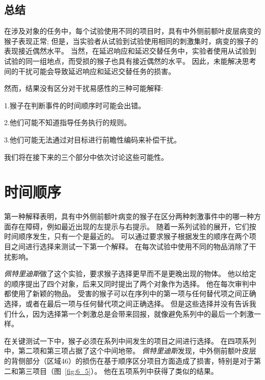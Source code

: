 \subsection{总结}

在涉及对象的任务中，每个试验使用不同的项目时，具有中外侧前额叶皮层病变的猴子表现正常; 
但是，当实验者从试验到试验使用相同的刺激集时，病变的猴子的表现接近偶然水平。
当然，在延迟响应和延迟交替任务中，实验者使用从试验到试验的同一组地点，而受损的猴子也具有接近偶然的水平。
因此，未能解决思考间的干扰可能会导致延迟响应和延迟交替任务的损害。


然而，结果没有区分对干扰易感性的三种可能解释:
\par


1.猴子在判断事件的时间顺序时可能会出错。
\par

2.他们可能不知道指导任务执行的规则。
\par

3.他们可能无法通过对目标进行前瞻性编码来补偿干扰。

我们将在接下来的三个部分中依次讨论这些可能性。



\section{时间顺序}

第一种解释表明，具有中外侧前额叶病变的猴子在区分两种刺激事件中的哪一种方面存在障碍，例如最近出现的左提示与右提示。
随着一系列试验的展开，它们按时间顺序发生，只有一个是最近的。
可以通过要求猴子根据发生的顺序在两个项目之间进行选择来测试一下第一个解释。
在每次试验中使用不同的物品消除了干扰影响。


\textit{佩特里迪斯}\cite{petrides1991functional}做了这个实验，要求猴子选择更早而不是更晚出现的物体。
他以给定的顺序提出了四个对象，后来又同时提出了两个对象作为选择。
他在每次审判中都使用了新颖的物品。
受害的猴子可以在序列中的第一项与任何替代项之间正确选择，或者在最后一项与任何替代项之间正确选择。
但是这些选择并没有告诉我们什么，因为选择第一个刺激总是会带来回报，就像避免系列中的最后一个刺激一样。


在关键测试一下中，猴子必须在系列中间发生的项目之间进行选择。
在四项系列中，第二项和第三项占据了这个中间地带。
\textit{佩特里迪斯}发现，中外侧前额叶皮层的背侧部分（区域46）的损伤在基于顺序区分项目方面造成了损害，特别是对于第二和第三项目（图~\ref{fig:6_5}）。
他在五项系列中获得了类似的结果。


